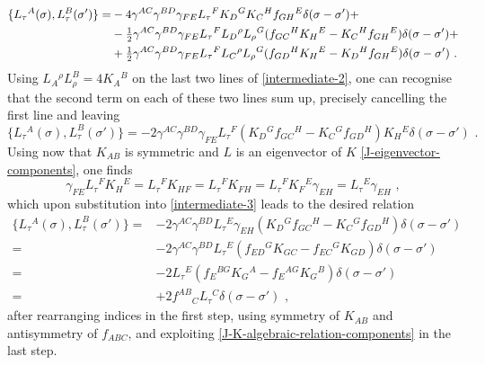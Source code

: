 \documentclass[12pt]{article}
\numberwithin{equation}{section}
\begin{document}
\begin{align}\label{intermediate-2}
\{ L_{\tau}{}^{A}(\sigma) ,L_{\tau}^{B}(\sigma') \} =&-4\gamma^{AC}\gamma^{BD}\gamma_{FE}L_{\tau}{}^{F}K_{D}{}^{G}K_{C}{}^{H}f_{GH}{}^{E}\delta(\sigma-\sigma')+
\\
& -\tfrac{1}{2}\gamma^{AC}\gamma^{BD}\gamma_{FE}L_{\tau}{}^{F}L_{D}{}^{\rho}L_{\rho}{}^{G}(f_{GC}{}^{H}K_{H}{}^{E}-K_{C}{}^{H}f_{GH}{}^{E})\delta(\sigma-\sigma')+
\notag \\
& +\tfrac{1}{2}\gamma^{AC}\gamma^{BD}\gamma_{FE}L_{\tau}{}^{F}L_{C}{}^{\rho}L_{\rho}{}^{G}(f_{GD}{}^{H}K_{H}{}^{E}-K_{D}{}^{H}f_{GH}{}^{E})\delta(\sigma-\sigma') \,\, .
\notag
\end{align}
Using $L_{A}{}^{\rho}L_{\rho}^{B}=4K_{A}{}^{B}$ on the last two lines of \eqref{intermediate-2}, one can recognise that the second term on each of these two lines sum up, precisely cancelling the first line and leaving 
\begin{equation}\label{intermediate-3}
\{ L_{\tau}{}^{A}(\sigma) ,L_{\tau}^{B}(\sigma') \} = -2 \gamma^{AC}\gamma^{BD}\gamma_{FE}L_{\tau}{}^{F}(K_{D}{}^{G}f_{GC}{}^{H}-K_{C}{}^{G}f_{GD}{}^{H})K_{H}{}^{E}\delta(\sigma-\sigma') \,\, .
\end{equation}
Using now that $K_{AB}$ is symmetric and $L$ is an eigenvector of $K$ \eqref{J-eigenvector-components}, one finds
\begin{equation}
\gamma_{FE}L_{\tau}{}^{F}K_{H}{}^{E}=L_{\tau}{}^{F}K_{HF}=L_{\tau}{}^{F}K_{FH}=L_{\tau}{}^{F}K_{F}{}^{E}\gamma_{EH}=L_{\tau}{}^{E}\gamma_{EH} \,\, ,
\end{equation}
which upon substitution into \eqref{intermediate-3} leads to the desired relation
\begin{equation}\label{SSSM-Jtau-Jtau-bracket-last-steps}
\begin{aligned}
\{ L_{\tau}{}^{A}(\sigma) ,L_{\tau}^{B}(\sigma') \} =&  -2 \gamma^{AC}\gamma^{BD}L_{\tau}{}^{E}\gamma_{EH}(K_{D}{}^{G}f_{GC}{}^{H}-K_{C}{}^{G}f_{GD}{}^{H})\delta(\sigma-\sigma') 
\\
=& -2 \gamma^{AC}\gamma^{BD}L_{\tau}{}^{E}(f_{ED}{}^{G}K_{GC}-f_{EC}{}^{G}K_{GD})\delta(\sigma-\sigma')
\\
=& -2L_{\tau}{}^{E}(f_{E}{}^{BG}K_{G}{}^{A}-f_{E}{}^{AG}K_{G}{}^{B})\delta(\sigma-\sigma')
\\
=&+2f^{AB}{}_{C}L_{\tau}{}^{C}\delta(\sigma-\sigma') \,\, ,
\end{aligned}
\end{equation}
after rearranging indices in the first step, using symmetry of $K_{AB}$ and antisymmetry of $f_{ABC}$, and exploiting \eqref{J-K-algebraic-relation-components} in the last step.
\end{document}
